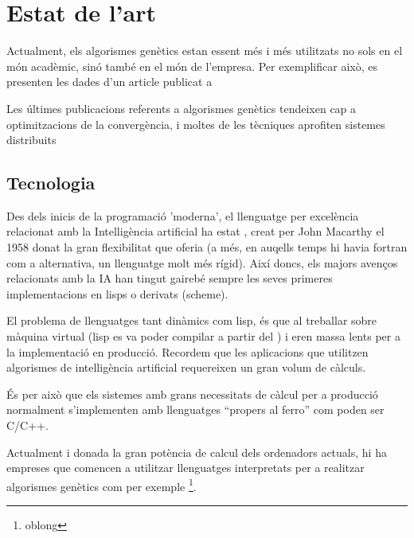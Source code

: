 \documentclass[a4paper]{article}
\begin{document}

\section{Estat de l'art} %
\label{sec:Estat de l'art}

Actualment, els algorismes genètics estan essent més i més utilitzats no sols en
el món acadèmic, sinó també en el món de l'empresa.  Per exemplificar això, es
presenten les dades d'un article publicat a 

Les últimes publicacions referents a algorismes genètics tendeixen cap a
optimitzacions de la convergència, i moltes de les tècniques aprofiten sistemes
distribuits



\subsection{Tecnologia} %
\label{sub:Tecnologia}

Des dels inicis de la programació 'moderna', el llenguatge per excelència
relacionat amb la Intelligència artificial ha estat \cite{LISP}, creat per John
Macarthy el 1958 donat la gran flexibilitat que oferia (a més, en auqells temps
hi havia fortran com a alternativa, un llenguatge molt més rígid).  Així doncs,
els majors avenços relacionats amb la IA han tingut gairebé sempre les seves
primeres implementacions en lisps o derivats (scheme).  

El problema de llenguatges tant dinàmics com lisp, és que al treballar sobre
màquina virtual (lisp es va poder compilar a partir del %
) i eren massa lents per a la implementació en producció.  Recordem que les
aplicacions que utilitzen algorismes de intelligència artificial requereixen un
gran volum de càlculs.

És per això que els sistemes amb grans necessitats de càlcul per a producció
normalment s'implementen amb llenguatges ``propers al ferro'' com poden ser
C/C++. 

Actualment i donada la gran potència de calcul dels ordenadors actuals, hi ha
empreses que comencen a utilitzar llenguatges interpretats per a realitzar
algorismes genètics  com per exemple \footnote{oblong}.

\end{document}
